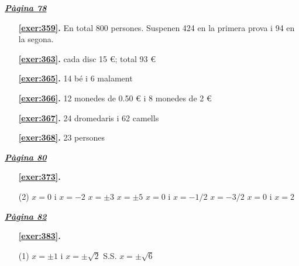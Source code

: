 
\hyperlink{page.78}{\textbf{\em Pàgina 78}}
\begin{enumerate}
\item[\fontfamily{phv}\selectfont\color{blue}\textbf{\ref{exer:359}. }] \label{ans:359} 
En total 800 persones. Suspenen 424 en la primera prova i 94 en la segona.
 \end{enumerate}
\begin{enumerate}
\item[\fontfamily{phv}\selectfont\color{blue}\textbf{\ref{exer:363}. }] \label{ans:363} 
cada disc 15 \euro {}; total 93 \euro {}
\item[\fontfamily{phv}\selectfont\color{blue}\textbf{\ref{exer:365}. }] \label{ans:365} 
14 bé i 6 malament
\item[\fontfamily{phv}\selectfont\color{blue}\textbf{\ref{exer:366}. }] \label{ans:366} 
12 monedes de 0.50 \euro {} i 8 monedes de 2 \euro {}
\item[\fontfamily{phv}\selectfont\color{blue}\textbf{\ref{exer:367}. }] \label{ans:367} 
24 dromedaris i 62 camells
\item[\fontfamily{phv}\selectfont\color{blue}\textbf{\ref{exer:368}. }] \label{ans:368} 
23 persones
 \end{enumerate}
\vspace{0.3cm}


\hyperlink{page.80}{\textbf{\em Pàgina 80}}
\begin{enumerate}



 \item[\fontfamily{phv}\selectfont\color{blue}\textbf{\ref{exer:373}. }] \label{ans:373}
 \begin{tasks}[column-sep=1em, item-indent=1.3333em](2)
	 \task $x=0$ i $x=-2$
	 \task $x=\pm 3$
	 \task $x=\pm 5$
	 \task $x=0$ i $x=-1/2$
	 \task $x=-3/2$
	 \task $x=0$ i $x=2$
\end{tasks}
 \end{enumerate}
\vspace{0.3cm}


\hyperlink{page.82}{\textbf{\em Pàgina 82}}
\begin{enumerate}



 \item[\fontfamily{phv}\selectfont\color{blue}\textbf{\ref{exer:383}. }] \label{ans:383}
 \begin{tasks}[column-sep=1em, item-indent=1.3333em](1)
	 \task $x=\pm 1$ i $x=\pm \sqrt {2}$
	 \task S.S.
	 \task $x=\pm \sqrt {6}$
\end{tasks}
 \end{enumerate}
\vspace{0.3cm}

